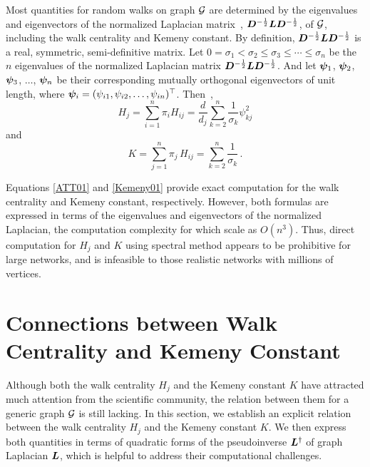 \documentclass[10pt,twocolumn,twoside]{IEEEtran}
\begin{document}
Most quantities for random walks on graph \(\mathcal{G}\) are determined by the eigenvalues and eigenvectors of the normalized Laplacian matrix~\cite{Ch97}, \({\boldsymbol{D}}^{-\frac{1}{2}}\boldsymbol{L} {\boldsymbol{D}}^{-\frac{1}{2}}\), of \(\mathcal{G}\), including the walk centrality and Kemeny constant. By definition, \({\boldsymbol{D}}^{-\frac{1}{2}}\boldsymbol{L} {\boldsymbol{D}}^{-\frac{1}{2}}\) is a real, symmetric, semi-definitive matrix. Let \(0=\sigma_1 < \sigma_2 \leq \sigma_3 \leq \cdots \leq \sigma_n \) be the \(n\) eigenvalues of the normalized Laplacian matrix \({\boldsymbol{D}}^{-\frac{1}{2}}\boldsymbol{L} {\boldsymbol{D}}^{-\frac{1}{2}}\). And let \(\boldsymbol{\psi}_1\), \(\boldsymbol{\psi}_2\), \(\boldsymbol{\psi}_3\), \(\ldots\), \(\boldsymbol{\psi}_n\) be their corresponding mutually orthogonal eigenvectors of unit length, where \(\boldsymbol{\psi}_i=(\psi_{i1},\psi_{i2},\ldots,\psi_{in})^{\top}\). Then~\cite{Lo93,Be16},
\begin{equation}\label{ATT01}
    H_j=\sum_{i=1}^{n} \pi_i H_{ij}=\frac{d}{d_j}\sum_{k=2}^{n}\frac{1}{\sigma_{k}}\psi_{kj}^{2}
\end{equation}
and
\begin{equation}\label{Kemeny01}
    K =\sum_{j=1}^{n}\pi_j\,H_{ij} =\sum_{k=2}^{n}\frac{1}{\sigma_{k}}\,.
\end{equation}

Equations \eqref{ATT01} and \eqref{Kemeny01} provide exact computation for the walk centrality and Kemeny constant, respectively. However, both formulas are expressed in terms of the eigenvalues and eigenvectors of the normalized Laplacian, the computation complexity for which scale as \(O(n^3)\). Thus, direct  computation for \(H_j\) and \(K\)  using spectral method appears to be prohibitive for large networks, and is infeasible to those realistic networks with millions of vertices.

\section{Connections between Walk Centrality and  Kemeny Constant}

Although both the walk centrality \(H_j\) and the Kemeny constant \(K\) have attracted much attention from the scientific community, the relation between  them for a generic  graph  \(\mathcal{G}\) is still lacking.
In this section, we establish an explicit relation between the walk centrality \(H_j\) and the Kemeny constant \(K\).
We then express both quantities in terms of quadratic forms of the pseudoinverse \(\boldsymbol{L}^{\dagger}\) of graph Laplacian \(\boldsymbol{L}\), which is helpful to address their computational challenges.
\end{document}
